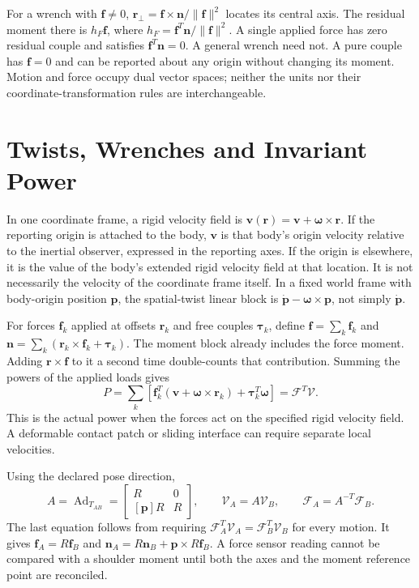 For a wrench with $\mathbf f\ne0$, $\mathbf r_\perp=\mathbf f\times\mathbf n/\|\mathbf f\|^2$ locates its central axis. The residual moment there is $h_F\mathbf f$, where $h_F=\mathbf f^T\mathbf n/\|\mathbf f\|^2$. A single applied force has zero residual couple and satisfies $\mathbf f^T\mathbf n=0$. A general wrench need not. A pure couple has $\mathbf f=0$ and can be reported about any origin without changing its moment. Motion and force occupy dual vector spaces; neither the units nor their coordinate-transformation rules are interchangeable.

\section{Twists, Wrenches and Invariant Power}
\label{sec:spatial_vectors}
\label{def:twist_def}
\label{def:wrench_def}

In one coordinate frame, a rigid velocity field is $\mathbf v(\mathbf r)=\mathbf v+\boldsymbol\omega\times\mathbf r$. If the reporting origin is attached to the body, $\mathbf v$ is that body's origin velocity relative to the inertial observer, expressed in the reporting axes. If the origin is elsewhere, it is the value of the body's extended rigid velocity field at that location. It is not necessarily the velocity of the coordinate frame itself. In a fixed world frame with body-origin position $\mathbf p$, the spatial-twist linear block is $\dot{\mathbf p}-\boldsymbol\omega\times\mathbf p$, not simply $\dot{\mathbf p}$.

For forces $\mathbf f_k$ applied at offsets $\mathbf r_k$ and free couples $\boldsymbol\tau_k$, define $\mathbf f=\sum_k\mathbf f_k$ and $\mathbf n=\sum_k(\mathbf r_k\times\mathbf f_k+\boldsymbol\tau_k)$. The moment block already includes the force moment. Adding $\mathbf r\times\mathbf f$ to it a second time double-counts that contribution. Summing the powers of the applied loads gives
\begin{equation}
P=\sum_k\left[\mathbf f_k^T(\mathbf v+\boldsymbol\omega\times\mathbf r_k)+\boldsymbol\tau_k^T\boldsymbol\omega\right]
=\mathcal F^T\mathcal V.
\end{equation}
This is the actual power when the forces act on the specified rigid velocity field. A deformable contact patch or sliding interface can require separate local velocities.

Using the declared pose direction,
\begin{equation}
A=\operatorname{Ad}_{T_{AB}}=
\begin{bmatrix}R&0\\{}[\mathbf p]R&R\end{bmatrix},\qquad
\mathcal V_A=A\mathcal V_B,\qquad
\mathcal F_A=A^{-T}\mathcal F_B.
\end{equation}
The last equation follows from requiring $\mathcal F_A^T\mathcal V_A=\mathcal F_B^T\mathcal V_B$ for every motion. It gives $\mathbf f_A=R\mathbf f_B$ and $\mathbf n_A=R\mathbf n_B+\mathbf p\times R\mathbf f_B$. A force sensor reading cannot be compared with a shoulder moment until both the axes and the moment reference point are reconciled.

